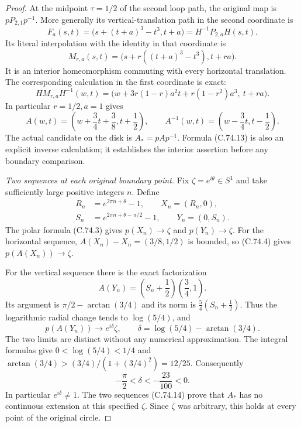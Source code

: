 \begin{proof}
At the midpoint $\tau=1/2$ of the second
loop path, the original map is
$pP_{2,1}p^{-1}$. More generally its
vertical-translation path in the second
coordinate is
\[
 F_a(s,t)=
       \bigl(s+(t+a)^3-t^3,t+a\bigr)
             =H^{-1}P_{2,a}H(s,t).                   \tag{C.74.10}
\]
Its literal interpolation with the identity
in that coordinate is
\[
 M_{r,a}(s,t)=
       \bigl(s+r((t+a)^3-t^3),t+ra\bigr).
                                                               \tag{C.74.11}
\]
It is an interior homeomorphism commuting
with every horizontal translation. The
corresponding calculation in the first
coordinate is exact:
\[
 H M_{r,a}H^{-1}(w,t)
  =\bigl(w+3r(1-r)a^2t+r(1-r^2)a^3,\ t+ra\bigr).
                                                               \tag{C.74.12}
\]
In particular $r=1/2,a=1$ gives
\[
 A(w,t)=\left(w+\frac34t+\frac38,t+\frac12\right),
 \qquad
 A^{-1}(w,t)=\left(w-\frac34t,t-\frac12\right).
                                                               \tag{C.74.13}
\]
The actual candidate on the disk is
$A_*=pAp^{-1}$. Formula (C.74.13) is also
an explicit inverse calculation; it
establishes the interior assertion before
any boundary comparison.

\emph{Two sequences at each original boundary point.}
Fix $\zeta=e^{i\theta}\in S^1$ and take
sufficiently large positive integers $n$.
Define
\[
 \begin{split}
 R_n&=e^{2\pi n+\theta}-1,\qquad X_n=(R_n,0),\\
 S_n&=e^{2\pi n+\theta-\pi/2}-1,\qquad Y_n=(0,S_n).
 \end{split}                                                   \tag{C.74.14}
\]
The polar formula (C.74.3) gives
$p(X_n)\to\zeta$ and $p(Y_n)\to\zeta$.
For the horizontal sequence,
$A(X_n)-X_n=(3/8,1/2)$ is bounded, so
(C.74.4) gives $p(A(X_n))\to\zeta$.

For the vertical sequence there is the
exact factorization
\[
        A(Y_n)=\left(S_n+\frac12\right)
                                   \left(\frac34,1\right).
                                                               \tag{C.74.15}
\]
Its argument is $\pi/2-\arctan(3/4)$
and its norm is $\frac54(S_n+\frac12)$.
Thus the logarithmic radial change tends
to $\log(5/4)$, and
\[
       p(A(Y_n))\longrightarrow e^{i\delta}\zeta,
          \qquad
       \delta=\log(5/4)-\arctan(3/4).                  \tag{C.74.16}
\]
The two limits are distinct without any
numerical approximation. The integral
formulas give
$0<\log(5/4)<1/4$ and
$\arctan(3/4)> (3/4)/(1+(3/4)^2)=12/25$.
Consequently
\[
                   -\frac{\pi}{2}<\delta<
                         -\frac{23}{100}<0.           \tag{C.74.17}
\]
In particular $e^{i\delta}\ne1$.
The two sequences (C.74.14) prove that
$A_*$ has no continuous extension at
this specified $\zeta$. Since $\zeta$
was arbitrary, this holds at every
point of the original circle.


\end{proof}
